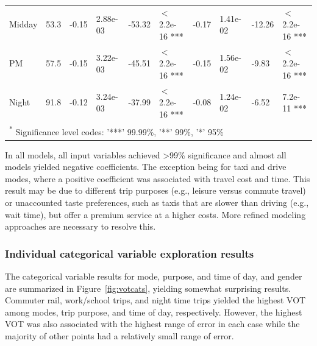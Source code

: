 \documentclass[numbered]{trbunofficial}\usepackage[]{graphicx}\usepackage[]{color}
\begin{document}
\begin{table}[H]
\begin{tabular}{lrllllllll}
\hspace{1em}Midday & 53.3 & -0.15 & 2.88e-03 & -53.32 & $<$ 2.2e-16 *** & -0.17 & 1.41e-02 & -12.26 & $<$ 2.2e-16 ***\\
\hspace{1em}PM & 57.5 & -0.15 & 3.22e-03 & -45.51 & $<$ 2.2e-16 *** & -0.15 & 1.56e-02 & -9.83 & $<$ 2.2e-16 ***\\
\hspace{1em}Night & 91.8 & -0.12 & 3.24e-03 & -37.99 & $<$ 2.2e-16 *** & -0.08 & 1.24e-02 & -6.52 & 7.2e-11 ***\\
\bottomrule
\multicolumn{10}{l}{\textsuperscript{*} Significance level codes: '***' 99.99\%, '**' 99\%, '*' 95\%}\\
\end{tabular}
\endgroup{}


\end{table}

In all models, all input variables achieved >99\% significance and almost all models yielded negative coefficients. The exception being for taxi and drive modes, where a positive coefficient was associated with travel cost and time. This result may be due to different trip purposes (e.g., leisure versus commute travel) or unaccounted taste preferences, such as taxis that are slower than driving (e.g., wait time), but offer a premium service at a higher costs. More refined modeling approaches are necessary to resolve this.

\subsubsection{Individual categorical variable exploration results}

The categorical variable results for mode, purpose, and time of day, and gender are summarized in Figure~\ref{fig:votcats}, yielding somewhat surprising results. Commuter rail, work/school trips, and night time trips yielded the highest VOT among modes, trip purpose, and time of day, respectively. However, the highest VOT was also associated with the highest range of error in each case while the majority of other points had a relatively small range of error. 
\end{document}
